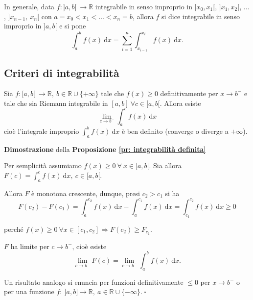 In generale, data $f:]a,b[ \ \rightarrow \mathbb{R}$ integrabile in senso improprio in $]x_0,x_1[$, $]x_1,x_2[$, $\ldots$, $]x_{n-1}, \ x_n[$ con $a = x_0 < x_1 < \ldots < x_n = b$, allora $f$ si dice integrabile in senso improprio in $]a,b[$ e si pone 
\begin{equation*}
	\int_{a}^{b} f(x) \ \mathrm{d}x= \sum_{i=1}^{n} \int_{x_{i-1}}^{x_i} f(x) \ \mathrm{d}x.
\end{equation*}

\subsection{Criteri di integrabilità}
\begin{proposition}
	\label{pr: integrabilità definita}
	Sia $f:[a,b[ \ \rightarrow \mathbb{R}, \ b \in \mathbb{R} \cup \{+\infty\}$ tale che $f(x) \geq 0$ definitivamente per $x \rightarrow b^-$ e tale che sia Riemann integrabile in $[a,b] \ \forall c \in [a,b[$. Allora esiste
	\begin{equation*}
		\lim_{c \rightarrow b^-} \int_{a}^{c} f(x) \ \mathrm{d}x
 	\end{equation*}
	cioè l'integrale improprio $\int_{a}^{b} f(x) \ \mathrm{d}x$ è ben definito (converge o diverge a $+\infty$).
\end{proposition}

\begin{dembar}
	\textbf{Dimostrazione} della \textbf{Proposizione \ref{pr: integrabilità definita}}
	
	
	Per semplicità assumiamo $f(x) \geq 0 \ \forall \ x \in [a,b[$. Sia allora $F(c)=\int_{a}^{c} f(x) \ \mathrm{d}x, \ c \in [a,b[$. 
	
	Allora $F$ è monotona crescente, dunque, presi $c_2 > c_1$ si ha
	\begin{equation*}
		F(c_2) - F(c_1) = \int_{a}^{c_2} f(x) \ \mathrm{d}x - \int_{a}^{c_1} f(x) \ \mathrm{d}x = \int_{c_1}^{c_2} f(x) \ \mathrm{d}x \geq 0
	\end{equation*}
	
	perché $f(x) \geq 0 \ \forall x \in [c_1,c_2] \Rightarrow F(c_2) \geq F_{c_1}$.
	
	$F$ ha limite per $c \rightarrow b^-$, cioè esiste
	\begin{equation*}
		\lim_{c \rightarrow b^-} F(c) = \lim_{c \rightarrow b^-} \int_{a}^{b} f(x) \ \mathrm{d}x.
	\end{equation*}
	
	Un risultato analogo si enuncia per funzioni definitivamente $\leq 0$ per $ x \rightarrow b^-$ o per una funzione $f: \ ]a,b] \rightarrow \mathbb{R}, \ a \in \mathbb{R} \cup \{-\infty\}. \ \square$ 
\end{dembar}


